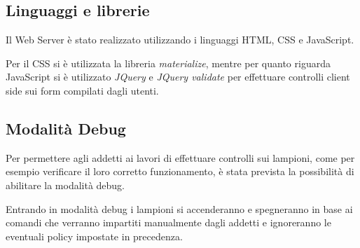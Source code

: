 \begin{figure}[tbp]
	\qquad
	\label{fig:example}%
\end{figure}

\newpage

\subsection{Linguaggi e librerie}

Il Web Server è stato realizzato utilizzando i linguaggi HTML, CSS e JavaScript.

Per il CSS si è utilizzata la libreria \textit{materialize}, mentre per quanto riguarda JavaScript si è utilizzato \textit{JQuery} e \textit{JQuery validate} per effettuare controlli client side sui form compilati dagli utenti.

\subsection{Modalità Debug}

Per permettere agli addetti ai lavori di effettuare controlli sui lampioni, come per esempio verificare il loro corretto funzionamento, è stata prevista la possibilità di abilitare la modalità debug.

Entrando in modalità debug i lampioni si accenderanno e spegneranno in base ai comandi che verranno impartiti manualmente dagli addetti e ignoreranno le eventuali policy impostate in precedenza.
